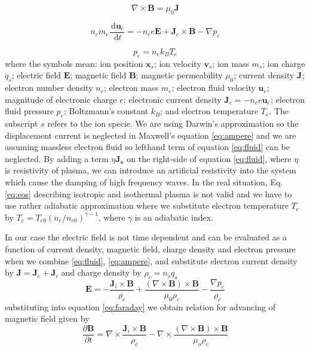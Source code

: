 \documentclass[oneside,branding,toc,article]{satdoc}
\newcommand{\mbf}[1]{\mathbf{#1}}              %
\begin{document}
\begin{equation}
  \nabla \times \mathbf{B} = \mu_0 \mathbf{J}
  \label{eq:ampere}
\end{equation}

\begin{equation}
  n_e m_e \frac{\, {\mathrm d}{\mathbf{u}_e}}{\, {\mathrm d}{t}} =
  - n_e e \mathbf{E} + \mathbf{J}_e \times \mathbf{B} - \nabla p_e
  \label{eq:fluid}
\end{equation}

\begin{equation}
  p_e = n_e k_B T_e
  \label{eq:eos}
\end{equation}
where the symbols mean: ion position $\mbf{x}_s$; ion velocity $\mbf{v}_s$; ion
mass $m_s$; ion charge $q_s$; electric field $\mbf{E}$; magnetic field
$\mbf{B}$; magnetic permeability $\mu_0$; current density $\mbf{J}$; electron
number density $n_e$; electron mass $m_e$; electron fluid velocity $\mbf{u}_e$;
magnitude of electronic charge $e$; electronic current density $\mbf{J}_e = -
n_e e \mbf{u}_e$; electron fluid pressure $p_e$; Boltzmann's constant $k_B$;
and electron temperature $T_e$. The subscript $s$ refers to the ion specie. We
are using Darwin's approximation so the displacement current is neglected in
Maxwell's equation \ref{eq:ampere} and we are assuming massless electron fluid
so lefthand term of equation \ref{eq:fluid} can be neglected. By adding a term
$\eta \mathbf{J_e}$ on the right-side of equation \ref{eq:fluid}, where $\eta$
is resistivity of plasma, we can introduce an artificial resistivity into the
system which cause the damping of high frequency waves.  In the real situation,
Eq. \ref{eq:eos} describing isotropic and isothermal plasma is not valid and we
have to use rather adiabatic approximation where we substitute electron
temperature $T_e$ by $T_e = T_{e0} (n_e / n_{e0})^{\gamma - 1}$, where $\gamma$
is an adiabatic index.

In our case the electric field is not time dependent and can be evaluated as a
function of current density, magnetic field, charge density and electron
pressure when we combine \ref{eq:fluid}, \ref{eq:ampere}, and substitute
electron current density by $\mbf{J} = \mbf{J}_e + \mbf{J}_i$ and charge
density by $\rho_c = n_s q_s$
\begin{equation}
  \label{eq:e}
  \mbf{E} = - \frac{\mbf{J}_i \times \mbf{B}}{\rho_c} +
  \frac{(\nabla \times \mbf{B}) \times \mbf{B}}{\mu_0 \rho_c} -
  \frac{\nabla p_e}{\rho_c}
\end{equation}
substituting into equation \ref{eq:faraday} we obtain relation for advancing of
magnetic field given by
\begin{equation}
  \label{eq:b}
  \frac{\partial \mbf{B}}{\partial t} =
  \nabla \times \frac{\mbf{J}_i \times \mbf{B}}{\rho_c} -
  \nabla \times \frac{(\nabla \times \mbf{B}) \times \mbf{B}}{\mu_o \rho_c}
\end{equation}
\end{document}
